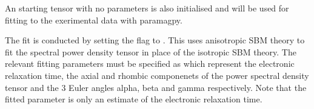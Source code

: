 \documentclass[a4paper,10pt,english,openany,oneside]{sphinxmanual}
\begin{document}
\begin{sphinxVerbatim}[commandchars=\\\{\}]
    

  \PYG{p}{[}
	\PYG{p}{[}  \PYG{p}{]}
	\PYG{p}{[}  \PYG{p}{]}
	\PYG{p}{[}  \PYG{p}{]}\PYG{p}{]}  
\end{sphinxVerbatim}

\sphinxAtStartPar
An starting tensor with no parameters is also initialised and will be used for fitting to the exerimental data with paramagpy.

\begin{sphinxVerbatim}[commandchars=\\\{\}]
    
\end{sphinxVerbatim}

\sphinxAtStartPar
The fit is conducted by setting the  flag to . This uses anisotropic SBM theory to fit the spectral power density tensor in place of the isotropic SBM theory. The relevant fitting parameters must be specified as  which represent the electronic relaxation time, the axial and rhombic componenets of the power spectral density tensor and the 3 Euler angles alpha, beta and gamma respectively. Note that the fitted  parameter is only an estimate of the electronic relaxation time.
\end{document}
